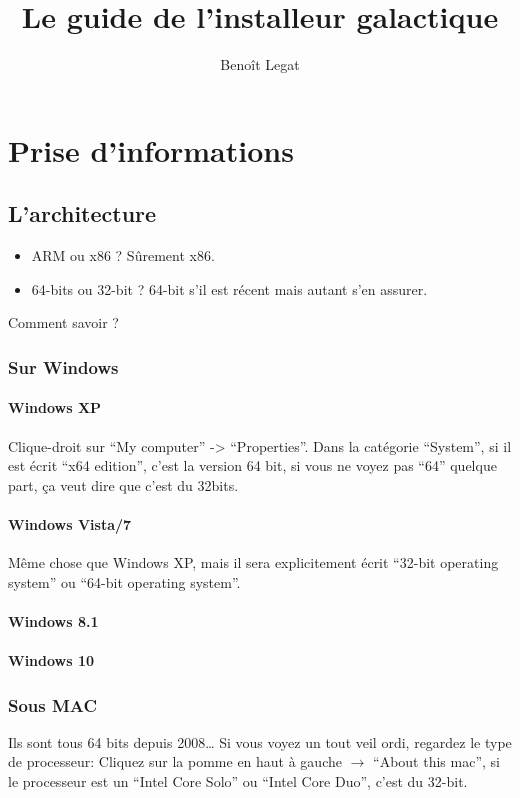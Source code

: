 \documentclass{../guide}
\title{Le guide de l'installeur galactique}
\author{Benoît Legat}
\begin{document}
\maketitle

\section{Prise d'informations}
\subsection{L'architecture}
\begin{itemize}
  \item ARM ou x86 ? Sûrement x86.
  \item 64-bits ou 32-bit ? 64-bit s'il est récent mais autant s'en assurer.
\end{itemize}

Comment savoir ?
\subsubsection{Sur Windows}
\paragraph{Windows XP}
Clique-droit sur ``My computer'' -> ``Properties''. Dans la catégorie ``System'', si il est écrit ``x64 edition'', c'est la version 64 bit, si vous ne voyez pas ``64'' quelque part, ça veut dire que c'est du 32bits.
\paragraph{Windows Vista/7}
Même chose que Windows XP, mais il sera explicitement écrit ``32-bit operating system'' ou ``64-bit operating system''.
\paragraph{Windows 8.1}
\paragraph{Windows 10}
\subsubsection{Sous MAC}
Ils sont tous 64 bits depuis 2008… Si vous voyez un tout veil ordi, regardez le type de processeur: Cliquez sur la pomme en haut à gauche $\to$ ``About this mac'', si le processeur est un ``Intel Core Solo'' ou ``Intel Core Duo'', c'est du 32-bit.
\end{document}
